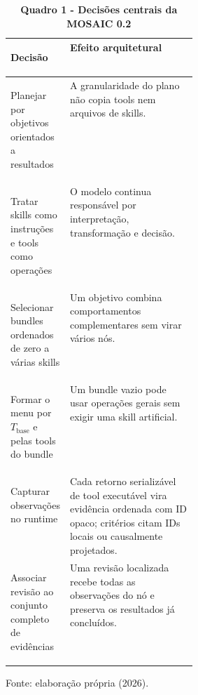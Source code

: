 \begin{table}[H]
\centering
\caption*{\textbf{Quadro 1 - Decisões centrais da MOSAIC 0.2}}
\small
\renewcommand{\arraystretch}{1.18}
\begin{tabularx}{\linewidth}{|>{\bfseries\raggedright\arraybackslash}p{0.31\linewidth}|Y|}
\hline
Decisão & Efeito arquitetural \\
\hline
Planejar por objetivos orientados a resultados &
A granularidade do plano não copia tools nem arquivos de skills. \\
\hline
Tratar skills como instruções e tools como operações &
O modelo continua responsável por interpretação, transformação e decisão. \\
\hline
Selecionar bundles ordenados de zero a várias skills &
Um objetivo combina comportamentos complementares sem virar vários nós. \\
\hline
Formar o menu por \(T_{\mathrm{base}}\) e pelas tools do bundle &
Um bundle vazio pode usar operações gerais sem exigir uma skill artificial. \\
\hline
Capturar observações no runtime &
Cada retorno serializável de tool executável vira evidência ordenada com ID opaco;
critérios citam IDs locais ou causalmente projetados. \\
\hline
Associar revisão ao conjunto completo de evidências &
Uma revisão localizada recebe todas as observações do nó e preserva os
resultados já concluídos. \\
\hline
\end{tabularx}
\par\smallskip\raggedright\small Fonte: elaboração própria (2026).
\end{table}

